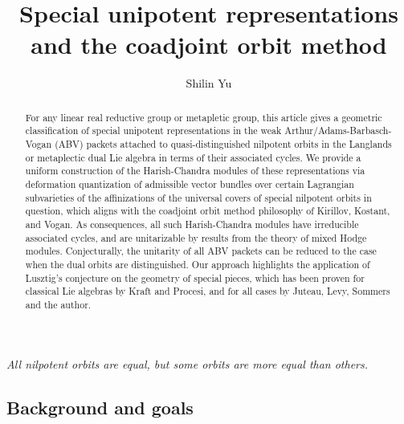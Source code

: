 \documentclass[11pt, a4paper]{amsart}
\title{Special unipotent representations and the coadjoint orbit method}
\author{Shilin Yu}
\makeatletter
\let\origsection\section
\renewcommand\section{\@ifstar{\starsection}{\nostarsection}}
\newcommand\nostarsection[1]
{\sectionprelude\origsection{#1}\sectionpostlude}
\newcommand\starsection[1]
{\sectionprelude\origsection*{#1}\sectionpostlude}
\newcommand\sectionprelude{%
  \vspace{1em}
}
\newcommand\sectionpostlude{%
  \vspace{1em}
}
\newcommand{\g}{\mathfrak{g}}
\theoremstyle{definition}
\numberwithin{equation}{section}
\makeatother
\begin{document}
\begin{abstract}
For any linear real reductive group or metapletic group, this article gives a geometric classification of special unipotent representations in the weak Arthur/Adams-Barbasch-Vogan (ABV) packets attached to quasi-distinguished nilpotent orbits in the Langlands or metaplectic dual Lie algebra in terms of their associated cycles.
%
We provide a uniform construction of the Harish-Chandra modules of these representations via deformation quantization of admissible vector bundles over certain Lagrangian subvarieties of the affinizations of the universal covers of special nilpotent orbits in question, which aligns with the coadjoint orbit method philosophy of Kirillov, Kostant, and Vogan. As consequences, all such Harish-Chandra modules have irreducible associated cycles, and are unitarizable by results from the theory of mixed Hodge modules. Conjecturally, the unitarity of all ABV packets can be reduced to the case when the dual orbits are distinguished.
%
Our approach highlights the application of Lusztig's conjecture on the geometry of special pieces, which has been proven for classical Lie algebras by Kraft and Procesi, and for all cases by Juteau, Levy, Sommers and the author.
\end{abstract}

\maketitle

\epigraph{\it All nilpotent orbits are equal, but some orbits are more equal than others.}{}

\tableofcontents

\section{Introduction}\label{sec:intr}

\subsection{Background and goals} \label{subsec:backgrounds}
\end{document}
